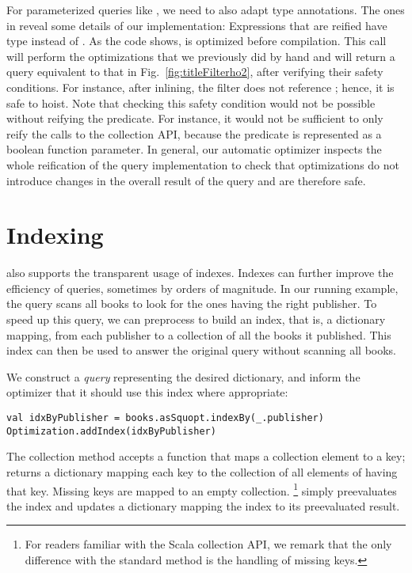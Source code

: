For parameterized queries like , we need to also adapt type annotations.
The ones in  reveal some details of our implementation:
Expressions that are reified have type  instead of .
As the code shows,  is optimized before compilation. This call will perform the optimizations that we previously did by hand
and will return a query equivalent to that in Fig.~\ref{fig:titleFilterho2}, after verifying their safety conditions. For instance,
after inlining, the filter  does not reference ; hence, it is safe to hoist.
Note that checking this safety condition would not be possible without reifying the predicate. For instance, it would
not be sufficient to only reify the calls to the collection API, because the predicate is represented as a boolean function parameter.
In general, our automatic optimizer inspects the whole reification of the query implementation to check that optimizations
do not introduce changes in the overall result of the query and are therefore safe.

\section{Indexing}

{\LoS} also supports the transparent usage of indexes. Indexes can further improve the efficiency of queries, sometimes by orders of magnitude.
In our running example, the query scans all books to look for the ones having the right publisher. To speed up this query, we can preprocess  to build an index, that is, a dictionary mapping, from each publisher to a collection of all the books it published. This index can then be used to answer the original query without scanning all books.

We construct a \emph{query} representing the desired dictionary, and inform the optimizer that it should use this index where appropriate:
\begin{lstlisting}
val idxByPublisher = books.asSquopt.indexBy(_.publisher)
Optimization.addIndex(idxByPublisher)
\end{lstlisting}

The  collection method accepts a function that maps a collection element to a key;  returns a dictionary mapping each key to the collection of all elements of  having that key. Missing keys are mapped to an empty collection.%
\footnote{For readers familiar with the Scala collection API, we remark that the only difference with the standard  method is the handling of missing keys.}
 simply preevaluates the index and updates a dictionary mapping the index to its preevaluated result.

